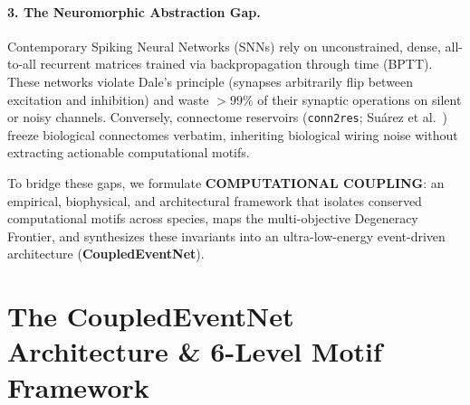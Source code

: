 \documentclass[10pt,twocolumn,letterpaper]{article}
\begin{document}
\paragraph{3. The Neuromorphic Abstraction Gap.} Contemporary Spiking Neural Networks (SNNs) rely on unconstrained, dense, all-to-all recurrent matrices trained via backpropagation through time (BPTT). These networks violate Dale's principle (synapses arbitrarily flip between excitation and inhibition) and waste $>99\%$ of their synaptic operations on silent or noisy channels. Conversely, connectome reservoirs (\texttt{conn2res}; Su{\'a}rez et al.~\cite{suarez2024connectome}) freeze biological connectomes verbatim, inheriting biological wiring noise without extracting actionable computational motifs.

To bridge these gaps, we formulate \textbf{COMPUTATIONAL COUPLING}: an empirical, biophysical, and architectural framework that isolates conserved computational motifs across species, maps the multi-objective Degeneracy Frontier, and synthesizes these invariants into an ultra-low-energy event-driven architecture (\textbf{CoupledEventNet}).

\section{The CoupledEventNet Architecture \& 6-Level Motif Framework}
\end{document}
